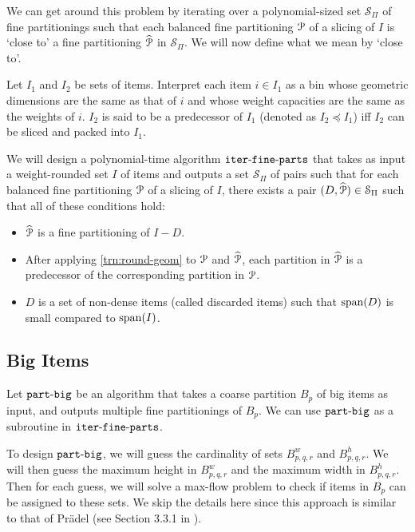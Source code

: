 We can get around this problem by iterating over a polynomial-sized set
$\mathcal{S}_{\Pi}$ of fine partitionings such that
each balanced fine partitioning $\mathcal{P}$ of a slicing of $I$ is `close to'
a fine partitioning $\widehat{\mathcal{P}}$ in $\mathcal{S}_{\Pi}$.
We will now define what we mean by `close to'.

\begin{definition}
Let $I_1$ and $I_2$ be sets of items. Interpret each item $i \in I_1$
as a bin whose geometric dimensions are the same as that of $i$
and whose weight capacities are the same as the weights of $i$.
$I_2$ is said to be a predecessor of $I_1$ (denoted as $I_2 \preceq I_1$)
iff $I_2$ can be sliced and packed into $I_1$.
\end{definition}

We will design a polynomial-time algorithm $\operatorname{\mathtt{iter-fine-parts}}$ that takes as input
a weight-rounded set $I$ of items and outputs a set $\mathcal{S}_{\Pi}$ of pairs such that
for each balanced fine partitioning $\mathcal{P}$ of a slicing of $I$,
there exists a pair
$(D, \widehat{\mathcal{P}}) \in \mathcal{S}_{\Pi}$ such that all of these conditions hold:
\begin{itemize}
\item $\widehat{\mathcal{P}}$ is a fine partitioning of $I-D$.
\item After applying \cref{trn:round-geom} to $\mathcal{P}$ and $\widehat{\mathcal{P}}$,
    each partition in $\widehat{\mathcal{P}}$ is a predecessor of the corresponding partition in $\mathcal{P}$.
\item $D$ is a set of non-dense items (called discarded items) such that $\operatorname{span}(D)$ is small
    compared to $\operatorname{span}(I)$.
\end{itemize}

\subsection{Big Items}

Let $\operatorname{\mathtt{part-big}}$ be an algorithm that takes a coarse partition $B_p$ of big items as input,
and outputs multiple fine partitionings of $B_p$.
We can use $\operatorname{\mathtt{part-big}}$ as a subroutine in $\operatorname{\mathtt{iter-fine-parts}}$.

To design $\operatorname{\mathtt{part-big}}$, we will guess the cardinality of sets $B^w_{p,q,r}$ and $B^h_{p,q,r}$.
We will then guess the maximum height in $B^w_{p,q,r}$ and the maximum width in $B^h_{p,q,r}$.
Then for each guess, we will solve a max-flow problem to check if items in $B_p$
can be assigned to these sets. We skip the details here since this approach
is similar to that of Pr\"adel (see Section 3.3.1 in \cite{pradel-thesis}).

